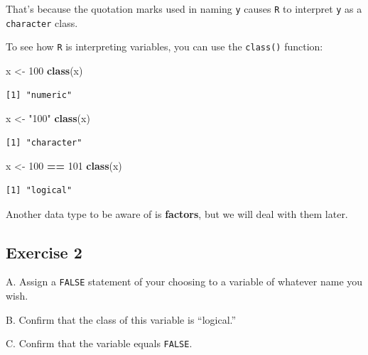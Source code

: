 \documentclass[
]{book}
\newenvironment{Shaded}{\begin{snugshade}}{\end{snugshade}}
\newcommand{\DecValTok}[1]{\textcolor[rgb]{0.00,0.00,0.81}{#1}}
\newcommand{\KeywordTok}[1]{\textcolor[rgb]{0.13,0.29,0.53}{\textbf{#1}}}
\newcommand{\NormalTok}[1]{#1}
\newcommand{\OperatorTok}[1]{\textcolor[rgb]{0.81,0.36,0.00}{\textbf{#1}}}
\newcommand{\StringTok}[1]{\textcolor[rgb]{0.31,0.60,0.02}{#1}}
\begin{document}
That's because the quotation marks used in naming \texttt{y} causes \texttt{R} to interpret \texttt{y} as a \texttt{character} class.

To see how \texttt{R} is interpreting variables, you can use the \texttt{class()} function:

\begin{Shaded}
\begin{Highlighting}[]
\NormalTok{x <-}\StringTok{ }\DecValTok{100}
\KeywordTok{class}\NormalTok{(x)}
\end{Highlighting}
\end{Shaded}

\begin{verbatim}
[1] "numeric"
\end{verbatim}

\begin{Shaded}
\begin{Highlighting}[]
\NormalTok{x <-}\StringTok{ "100"}
\KeywordTok{class}\NormalTok{(x)}
\end{Highlighting}
\end{Shaded}

\begin{verbatim}
[1] "character"
\end{verbatim}

\begin{Shaded}
\begin{Highlighting}[]
\NormalTok{x <-}\StringTok{ }\DecValTok{100} \OperatorTok{==}\StringTok{ }\DecValTok{101}
\KeywordTok{class}\NormalTok{(x)}
\end{Highlighting}
\end{Shaded}

\begin{verbatim}
[1] "logical"
\end{verbatim}

Another data type to be aware of is \textbf{factors}, but we will deal with them later.

\hypertarget{exercise-2-1}{%
\subsection*{Exercise 2}\label{exercise-2-1}}

A. Assign a \texttt{FALSE} statement of your choosing to a variable of whatever name you wish.

B. Confirm that the class of this variable is ``logical.''

C. Confirm that the variable equals \texttt{FALSE}.
\end{document}
